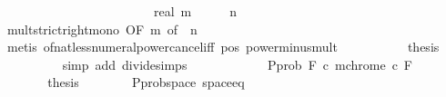 \begin{isabellebody}
\ \ \ \ \isamarkupfalse%
\ \isamarkupfalse%
\ {\isachardoublequoteopen}{\isasymdots}\ {\isacharless}{\kern0pt}\ {}{\isachardoublequoteclose}\isanewline
\ \ \ \ \isamarkupfalse%
\ {\isacharminus}{\kern0pt}\isanewline
\ \ \ \ \ \ \isamarkupfalse%
\ {\isachardoublequoteopen}real\ {\isacharparenleft}{\kern0pt}m\ {\isacharasterisk}{\kern0pt}\ {}{\isacharparenright}{\kern0pt}\ {\isacharless}{\kern0pt}\ {}\ {\isacharcircum}{\kern0pt}\ n{\isachardoublequoteclose}\isanewline
\ \ \ \ \ \ \ \ \isamarkupfalse%
\ mult{\isacharunderscore}{\kern0pt}strict{\isacharunderscore}{\kern0pt}right{\isacharunderscore}{\kern0pt}mono\ {\isacharbrackleft}{\kern0pt}OF\ m{\isacharcomma}{\kern0pt}\ of\ {}{\isacharbrackright}{\kern0pt}\ {\isacartoucheopen}n{\isachargreater}{\kern0pt}{}{\isacartoucheclose}\isanewline
\ \ \ \ \ \ \ \ \isamarkupfalse%
\ {\isacharparenleft}{\kern0pt}metis\ of{\isacharunderscore}{\kern0pt}nat{\isacharunderscore}{\kern0pt}less{\isacharunderscore}{\kern0pt}numeral{\isacharunderscore}{\kern0pt}power{\isacharunderscore}{\kern0pt}cancel{\isacharunderscore}{\kern0pt}iff\ pos{}\ power{\isacharunderscore}{\kern0pt}minus{\isacharunderscore}{\kern0pt}mult{\isacharparenright}{\kern0pt}\ \isanewline
\ \ \ \ \ \ \isamarkupfalse%
\ \isamarkupfalse%
\ {\isacharquery}{\kern0pt}thesis\isanewline
\ \ \ \ \ \ \ \ \isamarkupfalse%
\ {\isacharparenleft}{\kern0pt}simp\ add{\isacharcolon}{\kern0pt}\ divide{\isacharunderscore}{\kern0pt}simps{\isacharparenright}{\kern0pt}\isanewline
\ \ \ \ \isamarkupfalse%
\isanewline
\ \ \ \ \isamarkupfalse%
\ \isamarkupfalse%
\ {\isachardoublequoteopen}P{\isachardot}{\kern0pt}prob\ {\isacharparenleft}{\kern0pt}{\isasymUnion}F{\isasymin}{\isasymF}{\isachardot}{\kern0pt}\ {\isasymUnion}c{\isacharless}{\kern0pt}{}{\isachardot}{\kern0pt}\ mchrome\ c\ F{\isacharparenright}{\kern0pt}\ {\isacharless}{\kern0pt}\ {}{\isachardoublequoteclose}\ \isakeywordONE{{\isachardot}{\kern0pt}}\isamarkupfalse%
\isanewline
\ \ \ \ \isamarkupfalse%
\ \isamarkupfalse%
\ {\isacharquery}{\kern0pt}thesis\isanewline
\ \ \ \ \ \ \isamarkupfalse%
\ P{\isachardot}{\kern0pt}prob{\isacharunderscore}{\kern0pt}space\ space{\isacharunderscore}{\kern0pt}eq\ \isamarkupfalse%

\end{isabellebody}
